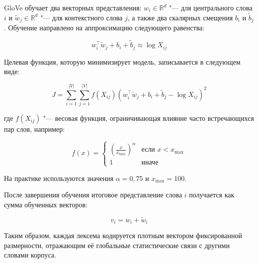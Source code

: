 \documentclass[coursework]{SCWorks}
\begin{document}
GloVe обучает два векторных представления: $w_i \in \mathbb{R}^d$ "--- для центрального слова $i$ и $\tilde{w}_j \in \mathbb{R}^d$ "--- для контекстного слова $j$, а также два скалярных смещения $b_i$ и $\tilde{b}_j$. Обучение направлено на аппроксимацию следующего равенства:

\[
w_i^\top \tilde{w}_j + b_i + \tilde{b}_j \approx \log X_{ij}
\]

Целевая функция, которую минимизирует модель, записывается в следующем виде:

\[
J = \sum_{i=1}^{|V|} \sum_{j=1}^{|V|} f(X_{ij}) \left(w_i^\top \tilde{w}_j + b_i + \tilde{b}_j - \log X_{ij} \right)^2
\]

где $f(X_{ij})$ "--- весовая функция, ограничивающая влияние часто встречающихся пар слов, например:

\[
f(x) = 
\begin{cases}
\left(\frac{x}{x_{\text{max}}}\right)^\alpha & \text{если } x < x_{\text{max}} \\
1 & \text{иначе}
\end{cases}
\]

На практике используются значения $\alpha = 0{,}75$ и $x_{\text{max}} = 100$.


После завершения обучения итоговое представление слова $i$ получается как сумма обученных векторов:

\[
v_i = w_i + \tilde{w}_i
\]

Таким образом, каждая лексема кодируется плотным вектором фиксированной размерности, отражающим её глобальные статистические связи с другими словами корпуса.



\end{document}
